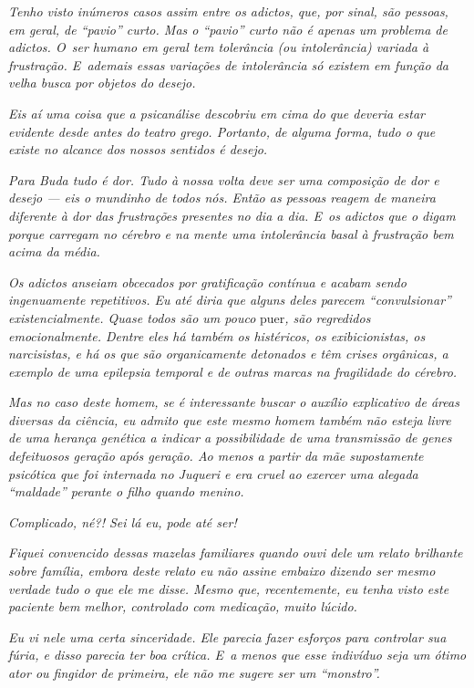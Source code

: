 \emph{Tenho visto inúmeros casos assim entre os adictos, que, por sinal,
são pessoas, em geral, de ``pavio'' curto. Mas o ``pavio'' curto não é
apenas um problema de adictos. O~ser humano em geral tem tolerância (ou
intolerância) variada à frustração. E~ademais essas variações de
intolerância só existem em função da velha busca por objetos do
desejo.}

\emph{Eis aí uma coisa que a psicanálise descobriu em cima do que
deveria estar evidente desde antes do teatro grego. Portanto, de alguma
forma, tudo o que existe no alcance dos nossos sentidos é desejo.}

\emph{Para Buda tudo é dor. Tudo à nossa volta deve ser uma composição
de dor e desejo --- eis o mundinho de todos nós. Então as pessoas reagem
de maneira diferente à dor das frustrações presentes no dia a dia. E~os
adictos que o digam porque carregam no cérebro e na mente uma
intolerância basal à frustração bem acima da média.}

\emph{Os adictos anseiam obcecados por gratificação contínua e acabam
sendo ingenuamente repetitivos. Eu até diria que alguns deles parecem
``convulsionar'' existencialmente. Quase todos são um pouco} puer\emph{, são
regredidos emocionalmente. Dentre eles há também os histéricos, os
exibicionistas, os narcisistas, e há os que são organicamente detonados
e têm crises orgânicas, a exemplo de uma epilepsia temporal e de outras
marcas na fragilidade do cérebro.}

\emph{Mas no caso deste homem, se é interessante buscar o auxílio
explicativo de áreas diversas da ciência, eu admito que este mesmo homem
também não esteja livre de uma herança genética a indicar a
possibilidade de uma transmissão de genes defeituosos geração após
geração. Ao menos a partir da mãe supostamente psicótica que foi
internada no Juqueri e era cruel ao exercer uma alegada ``maldade''
perante o filho quando menino.}

\emph{Complicado, né?! Sei lá eu, pode até ser!}

\emph{Fiquei convencido dessas mazelas familiares quando ouvi dele um
relato brilhante sobre família, embora deste relato eu não assine
embaixo dizendo ser mesmo verdade tudo o que ele me disse. Mesmo que,
recentemente, eu tenha visto este paciente bem melhor, controlado com
medicação, muito lúcido.}

\emph{Eu vi nele uma certa sinceridade. Ele parecia fazer esforços para
controlar sua fúria, e disso parecia ter boa crítica. E~a menos que esse
indivíduo seja um ótimo ator ou fingidor de primeira, ele não me sugere
ser um ``monstro''.}

